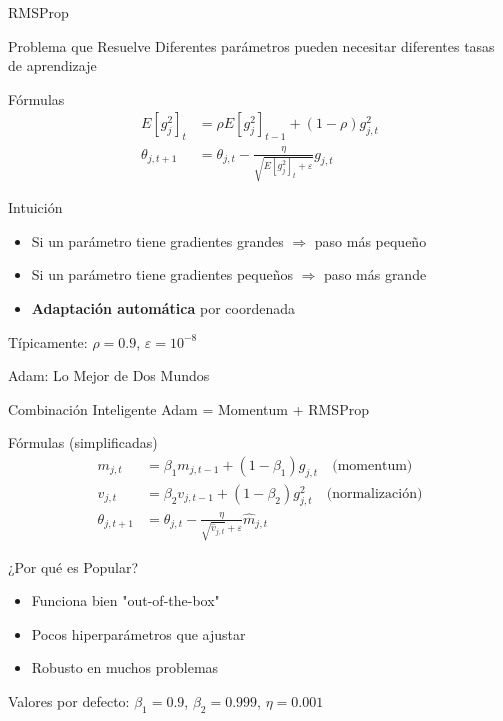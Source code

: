 \documentclass[10pt]{beamer}
\begin{document}
\begin{frame}{RMSProp}
\begin{block}{Problema que Resuelve}
Diferentes parámetros pueden necesitar diferentes tasas de aprendizaje
\end{block}

\begin{block}{Fórmulas}
\begin{align}
E[g_j^2]_t &= \rho E[g_j^2]_{t-1} + (1-\rho) g_{j,t}^2 \\
\theta_{j,t+1} &= \theta_{j,t} - \frac{\eta}{\sqrt{E[g_j^2]_t + \varepsilon}} g_{j,t}
\end{align}
\end{block}

\begin{exampleblock}{Intuición}
\begin{itemize}
\item Si un parámetro tiene gradientes grandes $\Rightarrow$ paso más pequeño
\item Si un parámetro tiene gradientes pequeños $\Rightarrow$ paso más grande
\item \textbf{Adaptación automática} por coordenada
\end{itemize}
\end{exampleblock}

Típicamente: $\rho = 0.9$, $\varepsilon = 10^{-8}$
\end{frame}

\begin{frame}{Adam: Lo Mejor de Dos Mundos}
\begin{block}{Combinación Inteligente}
Adam = Momentum + RMSProp
\end{block}

\begin{block}{Fórmulas (simplificadas)}
\begin{align}
m_{j,t} &= \beta_1 m_{j,t-1} + (1-\beta_1) g_{j,t} \quad \text{(momentum)} \\
v_{j,t} &= \beta_2 v_{j,t-1} + (1-\beta_2) g_{j,t}^2 \quad \text{(normalización)} \\
\theta_{j,t+1} &= \theta_{j,t} - \frac{\eta}{\sqrt{\hat{v}_{j,t}} + \varepsilon} \hat{m}_{j,t}
\end{align}
\end{block}

\begin{block}{¿Por qué es Popular?}
\begin{itemize}
\item Funciona bien "out-of-the-box"
\item Pocos hiperparámetros que ajustar
\item Robusto en muchos problemas
\end{itemize}
\end{block}

Valores por defecto: $\beta_1 = 0.9$, $\beta_2 = 0.999$, $\eta = 0.001$
\end{frame}
\end{document}
